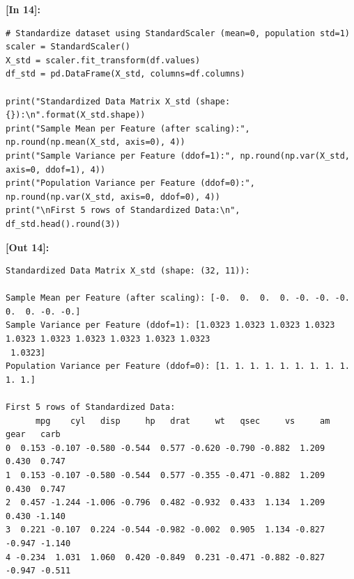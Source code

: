 \vspace{0.6em}
\noindent\textbf{\small [In 14]:}
\begin{lstlisting}[style=pycode]
# Standardize dataset using StandardScaler (mean=0, population std=1)
scaler = StandardScaler()
X_std = scaler.fit_transform(df.values)
df_std = pd.DataFrame(X_std, columns=df.columns)

print("Standardized Data Matrix X_std (shape: {}):\n".format(X_std.shape))
print("Sample Mean per Feature (after scaling):", np.round(np.mean(X_std, axis=0), 4))
print("Sample Variance per Feature (ddof=1):", np.round(np.var(X_std, axis=0, ddof=1), 4))
print("Population Variance per Feature (ddof=0):", np.round(np.var(X_std, axis=0, ddof=0), 4))
print("\nFirst 5 rows of Standardized Data:\n", df_std.head().round(3))
\end{lstlisting}
\noindent\textbf{\small [Out 14]:}
\begin{lstlisting}[style=output]
Standardized Data Matrix X_std (shape: (32, 11)):

Sample Mean per Feature (after scaling): [-0.  0.  0.  0. -0. -0. -0.  0.  0. -0. -0.]
Sample Variance per Feature (ddof=1): [1.0323 1.0323 1.0323 1.0323 1.0323 1.0323 1.0323 1.0323 1.0323 1.0323
 1.0323]
Population Variance per Feature (ddof=0): [1. 1. 1. 1. 1. 1. 1. 1. 1. 1. 1.]

First 5 rows of Standardized Data:
      mpg    cyl   disp     hp   drat     wt   qsec     vs     am   gear   carb
0  0.153 -0.107 -0.580 -0.544  0.577 -0.620 -0.790 -0.882  1.209  0.430  0.747
1  0.153 -0.107 -0.580 -0.544  0.577 -0.355 -0.471 -0.882  1.209  0.430  0.747
2  0.457 -1.244 -1.006 -0.796  0.482 -0.932  0.433  1.134  1.209  0.430 -1.140
3  0.221 -0.107  0.224 -0.544 -0.982 -0.002  0.905  1.134 -0.827 -0.947 -1.140
4 -0.234  1.031  1.060  0.420 -0.849  0.231 -0.471 -0.882 -0.827 -0.947 -0.511
\end{lstlisting}

